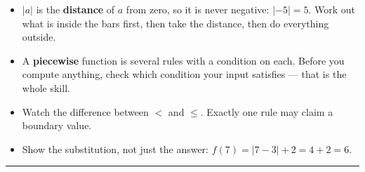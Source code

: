 \documentclass[12pt]{article}
\begin{document}

\begin{itemize}[leftmargin=0.7cm, itemsep=1pt, topsep=2pt]
  \item $|a|$ is the \textbf{distance} of $a$ from zero, so it is never negative: $|{-5}| = 5$. Work out what is inside the bars first, then take the distance, then do everything outside.
  \item A \textbf{piecewise} function is several rules with a condition on each. Before you compute anything, check which condition your input satisfies --- that is the whole skill.
  \item Watch the difference between $<$ and $\le$. Exactly one rule may claim a boundary value.
  \item Show the substitution, not just the answer: $f(7) = |7-3| + 2 = 4 + 2 = 6$.
\end{itemize}

\vspace{0.15cm}
\noindent\rule{\linewidth}{0.4pt}



\end{document}
